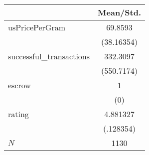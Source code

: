 {
\def\sym#1{\ifmmode^{#1}\else\(^{#1}\)\fi}
\begin{tabular}{l*{1}{c}}
\hline\hline
            &   Mean/Std.\\
\hline
usPricePerGram&     69.8593\\
            &  (38.16354)\\
successful\_transactions&    332.3097\\
            &  (550.7174)\\
escrow      &           1\\
            &         (0)\\
rating      &    4.881327\\
            &   (.128354)\\
\hline
\(N\)       &        1130\\
\hline\hline
\end{tabular}
}
